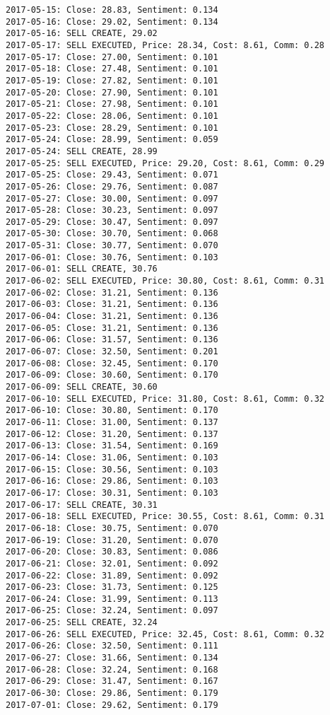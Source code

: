 \documentclass[11pt]{article}
\begin{document}
\begin{Verbatim}[commandchars=\\\{\}]
2017-05-15: Close: 28.83, Sentiment: 0.134
2017-05-16: Close: 29.02, Sentiment: 0.134
2017-05-16: SELL CREATE, 29.02
2017-05-17: SELL EXECUTED, Price: 28.34, Cost: 8.61, Comm: 0.28
2017-05-17: Close: 27.00, Sentiment: 0.101
2017-05-18: Close: 27.48, Sentiment: 0.101
2017-05-19: Close: 27.82, Sentiment: 0.101
2017-05-20: Close: 27.90, Sentiment: 0.101
2017-05-21: Close: 27.98, Sentiment: 0.101
2017-05-22: Close: 28.06, Sentiment: 0.101
2017-05-23: Close: 28.29, Sentiment: 0.101
2017-05-24: Close: 28.99, Sentiment: 0.059
2017-05-24: SELL CREATE, 28.99
2017-05-25: SELL EXECUTED, Price: 29.20, Cost: 8.61, Comm: 0.29
2017-05-25: Close: 29.43, Sentiment: 0.071
2017-05-26: Close: 29.76, Sentiment: 0.087
2017-05-27: Close: 30.00, Sentiment: 0.097
2017-05-28: Close: 30.23, Sentiment: 0.097
2017-05-29: Close: 30.47, Sentiment: 0.097
2017-05-30: Close: 30.70, Sentiment: 0.068
2017-05-31: Close: 30.77, Sentiment: 0.070
2017-06-01: Close: 30.76, Sentiment: 0.103
2017-06-01: SELL CREATE, 30.76
2017-06-02: SELL EXECUTED, Price: 30.80, Cost: 8.61, Comm: 0.31
2017-06-02: Close: 31.21, Sentiment: 0.136
2017-06-03: Close: 31.21, Sentiment: 0.136
2017-06-04: Close: 31.21, Sentiment: 0.136
2017-06-05: Close: 31.21, Sentiment: 0.136
2017-06-06: Close: 31.57, Sentiment: 0.136
2017-06-07: Close: 32.50, Sentiment: 0.201
2017-06-08: Close: 32.45, Sentiment: 0.170
2017-06-09: Close: 30.60, Sentiment: 0.170
2017-06-09: SELL CREATE, 30.60
2017-06-10: SELL EXECUTED, Price: 31.80, Cost: 8.61, Comm: 0.32
2017-06-10: Close: 30.80, Sentiment: 0.170
2017-06-11: Close: 31.00, Sentiment: 0.137
2017-06-12: Close: 31.20, Sentiment: 0.137
2017-06-13: Close: 31.54, Sentiment: 0.169
2017-06-14: Close: 31.06, Sentiment: 0.103
2017-06-15: Close: 30.56, Sentiment: 0.103
2017-06-16: Close: 29.86, Sentiment: 0.103
2017-06-17: Close: 30.31, Sentiment: 0.103
2017-06-17: SELL CREATE, 30.31
2017-06-18: SELL EXECUTED, Price: 30.55, Cost: 8.61, Comm: 0.31
2017-06-18: Close: 30.75, Sentiment: 0.070
2017-06-19: Close: 31.20, Sentiment: 0.070
2017-06-20: Close: 30.83, Sentiment: 0.086
2017-06-21: Close: 32.01, Sentiment: 0.092
2017-06-22: Close: 31.89, Sentiment: 0.092
2017-06-23: Close: 31.73, Sentiment: 0.125
2017-06-24: Close: 31.99, Sentiment: 0.113
2017-06-25: Close: 32.24, Sentiment: 0.097
2017-06-25: SELL CREATE, 32.24
2017-06-26: SELL EXECUTED, Price: 32.45, Cost: 8.61, Comm: 0.32
2017-06-26: Close: 32.50, Sentiment: 0.111
2017-06-27: Close: 31.66, Sentiment: 0.134
2017-06-28: Close: 32.24, Sentiment: 0.168
2017-06-29: Close: 31.47, Sentiment: 0.167
2017-06-30: Close: 29.86, Sentiment: 0.179
2017-07-01: Close: 29.62, Sentiment: 0.179

\end{Verbatim}
\end{document}
